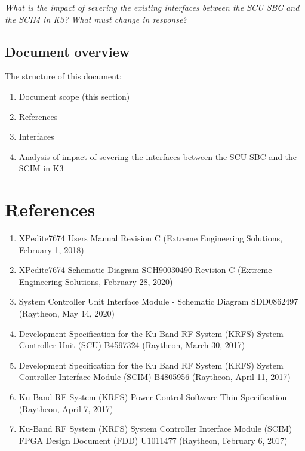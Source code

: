 \documentclass[12pt]{article}
\begin{document}
{\emph{What is the impact of severing the existing interfaces between the SCU
SBC and the SCIM in K3? What must change in response?}

\subsection{Document overview}
The structure of this document:

\begin{enumerate}
    \item Document scope (this section)
    \item References
    \item Interfaces
    \item Analysis of impact of severing the interfaces between the SCU
    SBC and the SCIM in K3
\end{enumerate}



\section{References}

\begin{enumerate}
    \item XPedite7674 Users Manual Revision C (Extreme Engineering Solutions, February 1, 2018) \label{ref:board_man}
    \item XPedite7674 Schematic Diagram SCH90030490 Revision C (Extreme Engineering Solutions, February 28, 2020) \label{ref:7674schematic}
    \item System Controller Unit Interface Module - Schematic Diagram SDD0862497 (Raytheon, May 14, 2020) \label{ref:scim_schematic}
    \item Development Specification for the Ku Band RF System (KRFS) System Controller Unit (SCU) B4597324 (Raytheon, March 30, 2017) \label{ref:dev_scu}
    \item Development Specification for the Ku Band RF System (KRFS) System Controller Interface Module (SCIM) B4805956 (Raytheon, April 11, 2017) \label{ref:dev_scim}
    \item Ku-Band RF System (KRFS) Power Control Software Thin Specification (Raytheon, April 7, 2017) \label{ref:power_control_sw}
    \item Ku-Band RF System (KRFS) System Controller Interface Module (SCIM) FPGA Design Document (FDD) U1011477 (Raytheon, February 6, 2017) \label{ref:scim_fdd}
\end{enumerate}


}
\end{document}
